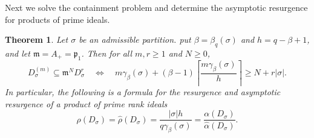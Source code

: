 \documentclass[11pt,reqno]{amsart}
\numberwithin{equation}{subsection}
\newtheorem{theorem}[equation]{Theorem}
\theoremstyle{definition}
\theoremstyle{remark}
\newcommand{\fp}{\mathfrak p}
\newcommand{\fm}{\mathfrak m}
\begin{document}
Next we solve the containment problem and determine the asymptotic resurgence for products of prime ideals.


\begin{theorem}
Let $\sigma$ be an admissible partition. put
$\beta=\beta_q(\sigma)$ and $h=q-\beta+1$, and let
$\fm=A_+=\fp_1$. Then for all $m,r\ge1$ and $N\ge0$,
\begin{equation}\label{eq:exact-containment}
 D_\sigma^{(m)}\subseteq\fm^N D_\sigma^r
 \quad\Longleftrightarrow\quad
 m\gamma_\beta(\sigma)+(\beta-1)\left\lceil\frac{m\gamma_\beta(\sigma)}{h}\right\rceil\ge N+r|\sigma|.
\end{equation}
In particular, the following is a formula for the resurgence and asymptotic resurgence of a product of prime rank ideals
\begin{equation}\label{eq:resurgence-formula}
 \rho(D_\sigma)=\widehat\rho(D_\sigma)
 =\frac{|\sigma|h}{q\gamma_\beta(\sigma)}
 =\frac{\alpha(D_\sigma)}{\widehat\alpha(D_\sigma)}.
\end{equation}

\end{theorem}
\end{document}

